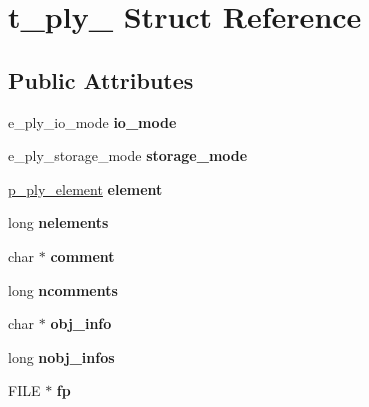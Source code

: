 \hypertarget{structt__ply__}{\section{t\-\_\-ply\-\_\- Struct Reference}
\label{structt__ply__}
}
\subsection*{Public Attributes}
\begin{DoxyCompactItemize}
\item 
\hypertarget{structt__ply___a9be7c67e21b3920c3b7893d78f21c2e8}{e\-\_\-ply\-\_\-io\-\_\-mode {\bfseries io\-\_\-mode}}\label{structt__ply___a9be7c67e21b3920c3b7893d78f21c2e8}

\item 
\hypertarget{structt__ply___a2feb88c586425471d4b6e786a4525207}{e\-\_\-ply\-\_\-storage\-\_\-mode {\bfseries storage\-\_\-mode}}\label{structt__ply___a2feb88c586425471d4b6e786a4525207}

\item 
\hypertarget{structt__ply___a7de540782943375c56f31074be82d207}{\hyperlink{structt__ply__element__}{p\-\_\-ply\-\_\-element} {\bfseries element}}\label{structt__ply___a7de540782943375c56f31074be82d207}

\item 
\hypertarget{structt__ply___a42fa31b10e98d40c726384903c4627c4}{long {\bfseries nelements}}\label{structt__ply___a42fa31b10e98d40c726384903c4627c4}

\item 
\hypertarget{structt__ply___a3e3fe7d31c905da0fb259cdc9a99f47f}{char $\ast$ {\bfseries comment}}\label{structt__ply___a3e3fe7d31c905da0fb259cdc9a99f47f}

\item 
\hypertarget{structt__ply___ab694821b90645fd2be0d8eb7c6d09fd2}{long {\bfseries ncomments}}\label{structt__ply___ab694821b90645fd2be0d8eb7c6d09fd2}

\item 
\hypertarget{structt__ply___a515f90aa2fce385e0e7d235de8361b07}{char $\ast$ {\bfseries obj\-\_\-info}}\label{structt__ply___a515f90aa2fce385e0e7d235de8361b07}

\item 
\hypertarget{structt__ply___abbc32008d7d5b85abd0d90ad3a701264}{long {\bfseries nobj\-\_\-infos}}\label{structt__ply___abbc32008d7d5b85abd0d90ad3a701264}

\item 
\hypertarget{structt__ply___a0637e03cf8c826220eac2865e1c13cd4}{F\-I\-L\-E $\ast$ {\bfseries fp}}\label{structt__ply___a0637e03cf8c826220eac2865e1c13cd4}


\end{DoxyCompactItemize}
